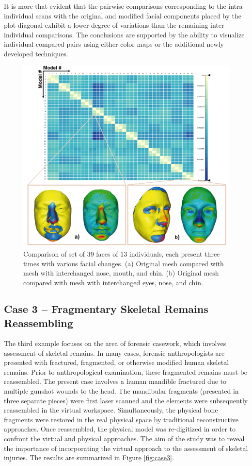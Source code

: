 \documentclass[final,5p,times]{elsarticle}
\begin{document}
It is more that evident that the pairwise comparisons corresponding to the intra-individual scans with the original and modified facial components placed by the plot diagonal exhibit a lower degree of variations than the remaining inter-individual comparisons.
The conclusions are supported by the ability to visualize individual compared pairs using either color maps or the additional newly developed techniques. 

\begin{figure}[htb]
	\centering
  \includegraphics[width=0.9\linewidth]{pictures/case2.png}
  \caption{\label{fig:case2}Comparison of set of 39 faces of 13 individuals, each present three times with various facial changes. (a) Original mesh compared with mesh with interchanged nose, mouth, and chin. (b) Original mesh compared with mesh with interchanged eyes, nose, and chin.}
\vspace{-3mm}
\end{figure}

\subsection{Case 3 -- Fragmentary Skeletal Remains Reassembling}
The third example focuses on the area of forensic casework, which involves assessment of skeletal remains. 
In many cases, forensic anthropologists are presented with fractured, fragmented, or otherwise modified human skeletal remains. 
Prior to anthropological examination, these fragmented remains must be reassembled. 
The present case involves a human mandible fractured due to multiple gunshot wounds to the head. 
The mandibular fragments (presented in three separate pieces) were first laser scanned and the elements were subsequently reassembled in the virtual workspace.
Simultaneously, the physical bone fragments were restored in the real physical space by traditional reconstructive approaches.
Once reassembled, the physical model was re-digitized in order to confront the virtual and physical approaches. 
The aim of the study was to reveal the importance of incorporating the virtual approach to the assessment of skeletal injuries. 
The results are summarized in Figure \ref{fig:case3}.
\end{document}
